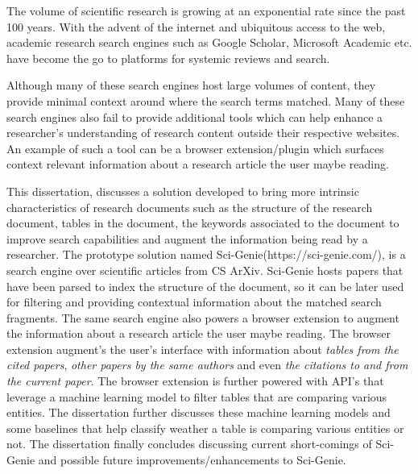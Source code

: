 The volume of scientific research is growing at an exponential rate since the past 100 years. 
With the advent of the internet and ubiquitous access to the web, academic research search engines such as Google Scholar, Microsoft Academic etc.
have become the go to platforms for systemic reviews and search. 

Although many of these search engines host large volumes of content, they provide minimal context around where the search terms matched. 
Many of these search engines also fail to provide additional tools which can help enhance a researcher's understanding of research content outside their respective websites.
An example of such a tool can be a browser extension/plugin which surfaces context relevant information about a research article the user maybe reading. 

This dissertation, discusses a solution developed to bring more intrinsic characteristics of research documents such as the structure of the research document, tables in the document,  
the keywords associated to the document to improve search capabilities and augment the information being read by a researcher.
The prototype solution named Sci-Genie(https://sci-genie.com/), is a search engine over scientific articles from CS ArXiv.
Sci-Genie hosts papers that have been parsed to index the structure of the document, so it can be later used for filtering and providing contextual information about the matched search fragments. 
The same search engine also powers a browser extension to augment the information about a research article the user maybe reading. 
The browser extension augment's the user's interface with information about \textit{tables from the cited papers}, \textit{other papers by the same authors} and even \textit{the citations to and from the current paper}. 
The browser extension is further powered with API's that leverage a machine learning model to filter tables that are comparing various entities. 
The dissertation further discusses these machine learning models and some baselines that help classify weather a table is comparing various entities or not.  
The dissertation finally concludes discussing current short-comings of Sci-Genie and possible future improvements/enhancements to Sci-Genie.



%   